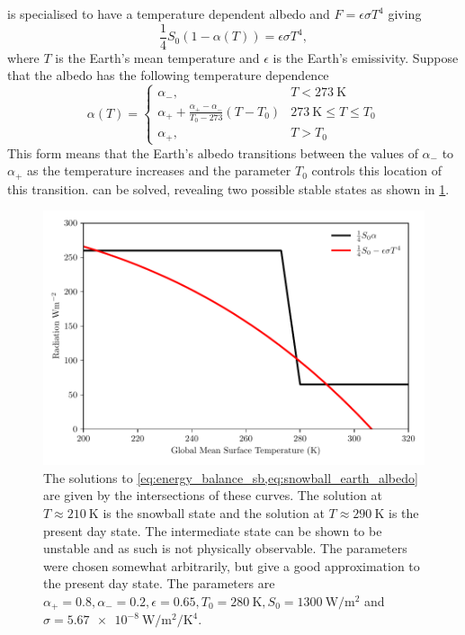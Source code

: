 is specialised to have a temperature dependent albedo and $F = \epsilon \sigma T^4$ giving
\begin{equation}
  \label{eq:energy_balance_sb}
  \frac{1}{4}S_0 \left(1 - \alpha\left(T\right)\right) = \epsilon \sigma T^4,
\end{equation}
where $T$ is the Earth's mean temperature and $\epsilon$ is the Earth's emissivity. Suppose that the albedo has the following
temperature dependence
\begin{equation}
  \label{eq:snowball_earth_albedo}
  \alpha(T) =
  \begin{cases}
    \alpha_- ,                                                         & T < \SI{273}{\kelvin} \\
    \alpha_+ + \frac{\alpha_+ - \alpha_-}{T_0 - 273} \left(T-T_0\right) & \SI{273}{\kelvin} \leq T \leq T_0 \\
    \alpha_+ ,                                                         & T > T_0
  \end{cases}
\end{equation}
This form means that the Earth's albedo transitions between the values of $\alpha_-$ to $\alpha_+$ as the temperature increases and the parameter $T_0$ controls this location of this transition.
 can be solved, revealing two possible stable states as shown in \cref{fig:energy_balance_solution}.
\begin{figure}
  \centering
  \includegraphics[width=\textwidth,keepaspectratio]{snowball}
  \caption[Snowball Earth Energy Balance]{The solutions to \cref{eq:energy_balance_sb,eq:snowball_earth_albedo} are given by the intersections of these curves.
    The solution at $T\approx\SI{210}{\kelvin}$ is the snowball
    state and the solution at $T\approx \SI{290}{\kelvin}$ is the present day state. The intermediate state can be shown to be unstable and as such is not physically observable. The parameters were
    chosen somewhat arbitrarily,  but give a good approximation to the present day state. The parameters are $\alpha_+ = 0.8,\alpha_-=0.2,\epsilon=0.65,T_0 = \SI{280}{\kelvin},S_0 = \SI{1300}{\watt\per\meter\squared}$
    and $\sigma = \SI{5.67e-8}{\watt\per\meter\squared\per\kelvin\tothe{4}}$.}
  \label{fig:energy_balance_solution}
\end{figure}

